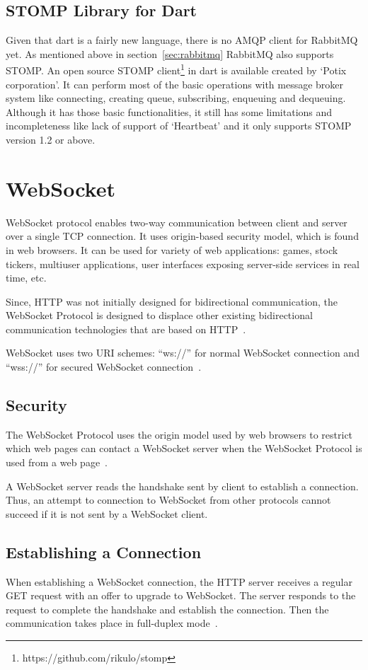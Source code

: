   \subsection{STOMP Library for Dart}
  \label{subsec:stompForDart}
  Given that dart is a fairly new language, there is no AMQP client for RabbitMQ yet. As mentioned above in section~\ref{sec:rabbitmq} RabbitMQ also supports STOMP. An open source STOMP client\footnote{https://github.com/rikulo/stomp} in dart is available created by ‘Potix corporation’. It can perform most of the basic operations with message broker system like connecting, creating queue, subscribing, enqueuing and dequeuing. Although it has those basic functionalities, it still has some limitations and incompleteness like lack of support of ‘Heartbeat’ and it only supports STOMP version 1.2 or above.


\section{WebSocket}
  WebSocket protocol enables two-way communication between client and server over a single TCP connection. It uses origin-based security model, which is found in web browsers. It can be used for variety of web applications: games, stock tickers, multiuser applications, user interfaces exposing server-side services in real time, etc.~\cite{rfc6455}

  Since, HTTP was not initially designed for bidirectional communication, the WebSocket Protocol is designed to displace other existing bidirectional communication technologies that are based on HTTP~\cite{rfc6455}.

  WebSocket uses two URI schemes: “ws://” for normal WebSocket connection and “wss://” for secured WebSocket connection~\cite{rfc6455}.

\subsection{Security}
  The WebSocket Protocol uses the origin model used by web browsers to restrict which web pages can contact a WebSocket server when the WebSocket Protocol is used from a web page~\cite{rfc6455}.

   A WebSocket server reads the handshake sent by client to establish a connection. Thus, an attempt to connection to WebSocket from other protocols cannot succeed if it is not sent by a WebSocket client.~\cite{rfc6455}

\subsection{Establishing a Connection}
  When establishing a WebSocket connection, the HTTP server receives a regular GET request with an offer to upgrade to WebSocket. The server responds to the request to complete the handshake and establish the connection. Then the communication takes place in full-duplex mode~\cite{rfc6455}.
